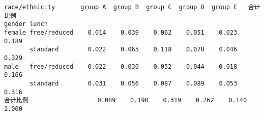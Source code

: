             \begin{tcolorbox}[breakable, size=fbox, boxrule=.5pt, pad at break*=1mm, opacityfill=0]
\begin{Verbatim}[commandchars=\\\{\}]
race/ethnicity       group A  group B  group C  group D  group E   合计比例
gender lunch
female free/reduced    0.014    0.039    0.062    0.051    0.023  0.189
       standard        0.022    0.065    0.118    0.078    0.046  0.329
male   free/reduced    0.022    0.030    0.052    0.044    0.018  0.166
       standard        0.031    0.056    0.087    0.089    0.053  0.316
合计比例                   0.089    0.190    0.319    0.262    0.140  1.000
\end{Verbatim}
\end{tcolorbox}
